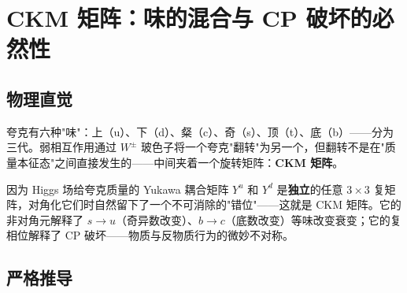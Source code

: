 \section{CKM 矩阵：味的混合与 CP 破坏的必然性}

\subsection{物理直觉}

夸克有六种"味"：上（u）、下（d）、粲（c）、奇（s）、顶（t）、底（b）——分为三代。弱相互作用通过 $W^\pm$ 玻色子将一个夸克"翻转"为另一个，但翻转不是在"质量本征态"之间直接发生的——中间夹着一个旋转矩阵：\textbf{CKM 矩阵}。

因为 Higgs 场给夸克质量的 Yukawa 耦合矩阵 $Y^{u}$ 和 $Y^{d}$ 是\textbf{独立}的任意 $3\times 3$ 复矩阵，对角化它们时自然留下了一个不可消除的"错位"——这就是 CKM 矩阵。它的非对角元解释了 $s\to u$（奇异数改变）、$b\to c$（底数改变）等味改变衰变；它的复相位解释了 CP 破坏——物质与反物质行为的微妙不对称。

\subsection{严格推导}

